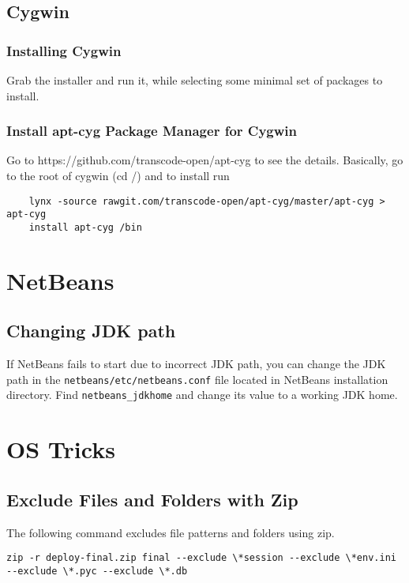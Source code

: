 \documentclass{article}
\begin{document}
  \subsection{Cygwin}
  \subsubsection{Installing Cygwin}
  Grab the installer and run it, while selecting some minimal set of packages to install. 
  \subsubsection{Install apt-cyg Package Manager for Cygwin} 
  Go to https://github.com/transcode-open/apt-cyg to see the details. 
  Basically, go to the root of cygwin (cd /) and to install run
  \begin{lstlisting}
    lynx -source rawgit.com/transcode-open/apt-cyg/master/apt-cyg > apt-cyg
    install apt-cyg /bin
  \end{lstlisting}
  
  

  \section{NetBeans}

    \subsection{Changing JDK path}
     If NetBeans fails to start due to incorrect JDK path, you can change the JDK path in the 
     \lstinline{netbeans/etc/netbeans.conf} file located in NetBeans installation directory.
     Find \lstinline{netbeans_jdkhome} and change its value to a working JDK home.




\section{OS Tricks}
\subsection{Exclude Files and Folders with Zip}
The following command excludes file patterns and folders using zip.
\begin{verbatim}
zip -r deploy-final.zip final --exclude \*session --exclude \*env.ini --exclude \*.pyc --exclude \*.db

\end{verbatim}
\end{document}
